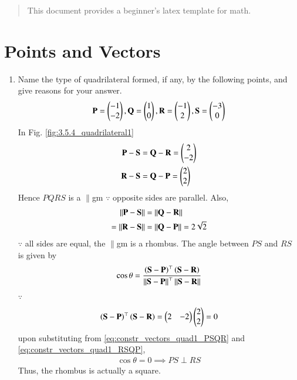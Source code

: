 \documentclass[journal,12pt,twocolumn]{IEEEtran}
\renewcommand\thesection{\arabic{section}}
\begin{document}
\maketitle


\renewcommand{\thefigure}{\theenumi}
\renewcommand{\thetable}{\theenumi}


\begin{abstract}
This document provides a beginner's latex template for math.
\end{abstract}

\section{Points and Vectors}
\renewcommand{\theequation}{\theenumi}
\begin{enumerate}[label=\thesection.\arabic*.,ref=\thesection.\theenumi]


\item Name the type of quadrilateral formed, if any, by the following points, and give reasons for your answer.
\begin{align}
\mathbf{P} = \begin{pmatrix}-1\\-2\end{pmatrix}, \mathbf{Q} =\begin{pmatrix}1\\0\end{pmatrix},
\mathbf{R} =\begin{pmatrix}-1\\2\end{pmatrix}, \mathbf{S} =\begin{pmatrix}-3\\0\end{pmatrix}
\end{align}
\solution
In Fig. 	\ref{fig:3.5.4_quadrilateral1}
\begin{align}
\label{eq:constr_vectors_quad1_PSQR}
 \mathbf{P} - \mathbf{S} &= 
 \mathbf{Q} - \mathbf{R} = \begin{pmatrix}2\\-2\end{pmatrix}
\\
\mathbf {R} - \mathbf {S} &=
 \mathbf {Q} - \mathbf {P} = \begin{pmatrix}2\\2\end{pmatrix}
\label{eq:constr_vectors_quad1_RSQP}
\end{align}
%
Hence $PQRS$ is a $\parallel$gm $\because$  opposite sides are parallel. Also, 
\begin{align}
\left\lVert \mathbf{P} - \mathbf{S}\right\rVert &= 
\left\lVert \mathbf{Q} - \mathbf{R}\right\rVert 
\\
=\left\lVert\mathbf {R} - \mathbf {S}\right\rVert &=
\left\lVert \mathbf {Q} - \mathbf {P}\right\rVert = 2\sqrt{2}
\end{align}
%
$\because$ all sides are equal, the $\parallel$gm is a rhombus. The angle between $PS$ and
$RS$ is given by 
\begin{align}
\cos \theta = \frac{\left(\mathbf{S}-\mathbf{P}\right)^{\top}\left(\mathbf{S}-\mathbf{R}\right)}{\left\lVert\mathbf{S}-\mathbf{P}\right\rVert^{\top}\left\lVert\mathbf{S}-\mathbf{R}\right\rVert}
\end{align}
%
$\because $
\begin{align}
\left(\mathbf{S}-\mathbf{P}\right)^{\top}\left(\mathbf{S}-\mathbf{R}\right) = \begin{pmatrix}2 & -2\end{pmatrix}\begin{pmatrix}2\\2\end{pmatrix} = 0
\end{align}
upon substituting from \eqref{eq:constr_vectors_quad1_PSQR} and \eqref{eq:constr_vectors_quad1_RSQP}, 
\begin{align}
\cos \theta = 0 \implies PS \perp RS
\end{align}
%
Thus, the rhombus is actually a square.


\end{enumerate}
\end{document}
